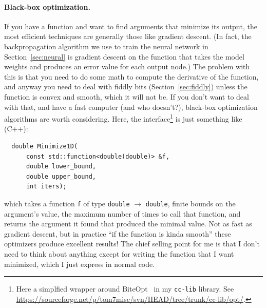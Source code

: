 \documentclass[twocolumn]{article}
\begin{document}
\paragraph{Black-box optimization.} If you have a function and want
to find arguments that minimize its output, the most efficient
techniques are generally those like gradient descent. (In fact, the
backpropagation algorithm we use to train the neural network in
Section~\ref{sec:neural} is gradient descent on the function that
takes the model weights and produces an error value for each output
node.) The problem with this is that you need to do some math to
compute the derivative of the function, and anyway you need to deal
with fiddly bits (Section~\ref{sec:fiddly}) unless the function is
convex and smooth, which it will not be. If you don't want to deal
with that, and have a fast computer (and who doesn't?), black-box
optimization algorithms are worth considering. Here, the
interface\footnote{ Here a simplfied wrapper around
  BiteOpt~\cite{biteopt} in my {\tt cc-lib} library. See
  \url{https://sourceforge.net/p/tom7misc/svn/HEAD/tree/trunk/cc-lib/opt/}.}
is just something like (C++):

\begin{verbatim}
  double Minimize1D(
      const std::function<double(double)> &f,
      double lower_bound,
      double upper_bound,
      int iters);
\end{verbatim}

which takes a function \verb+f+ of type \verb+double+ $\rightarrow$
\verb+double+, finite bounds on the argument's value, the maximum
number of times to call that function, and returns the argument it
found that produced the minimal value. Not as fast as gradient
descent, but in practice ``if the function is kinda smooth'' these
optimizers produce excellent results! The chief selling point for me
is that I don't need to think about anything except for writing the
function that I want minimized, which I just express in normal code.
\end{document}
